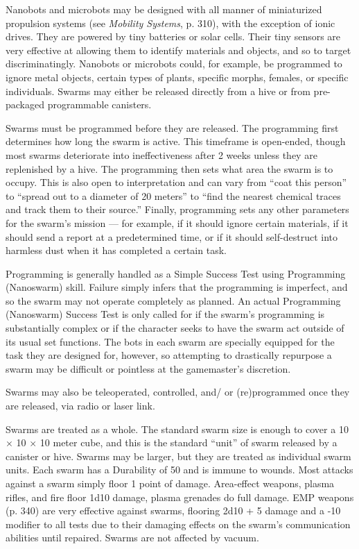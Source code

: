 Nanobots and microbots may be designed with all manner of miniaturized propulsion systems (see \emph{Mobility Systems}, p. 310), with the exception of ionic drives. They are powered by tiny batteries or solar cells. Their tiny sensors are very effective at allowing them to identify materials and objects, and so to target discriminatingly. Nanobots or microbots could, for example, be programmed to ignore metal objects, certain types of plants, specific morphs, females, or specific individuals. Swarms may either be released directly from a hive or from pre-packaged programmable canisters.

Swarms must be programmed before they are released. The programming first determines how long the swarm is active. This timeframe is open-ended, though most swarms deteriorate into ineffectiveness after 2 weeks unless they are replenished by a hive. The programming then sets what area the swarm is to occupy. This is also open to interpretation and can vary from ``coat this person'' to ``spread out to a diameter of 20 meters'' to ``find the nearest chemical traces and track them to their source.'' Finally, programming sets any other parameters for the swarm’s mission --- for example, if it should ignore certain materials, if it should send a report at a predetermined time, or if it should self-destruct into harmless dust when it has completed a certain task.

Programming is generally handled as a Simple Success Test using Programming (Nanoswarm) skill. Failure simply infers that the programming is imperfect, and so the swarm may not operate completely as planned. An actual Programming (Nanoswarm) Success Test is only called for if the swarm’s programming is substantially complex or if the character seeks to have the swarm act outside of its usual set functions. The bots in each swarm are specially equipped for the task they are designed for, however, so attempting to drastically repurpose a swarm may be difficult or pointless at the gamemaster’s discretion.

Swarms may also be teleoperated, controlled, and/ or (re)programmed once they are released, via radio or laser link.

Swarms are treated as a whole. The standard swarm size is enough to cover a 10 $\times$ 10 $\times$ 10 meter cube, and this is the standard ``unit'' of swarm released by a canister or hive. Swarms may be larger, but they are treated as individual swarm units. Each swarm has a Durability of 50 and is immune to wounds. Most attacks against a swarm simply floor 1 point of damage. Area-effect weapons, plasma rifles, and fire floor 1d10 damage, plasma grenades do full damage. EMP weapons (p. 340) are very effective against swarms, flooring 2d10 + 5 damage and a -10 modifier to all tests due to their damaging effects on the swarm’s communication abilities until repaired. Swarms are not affected by vacuum.

